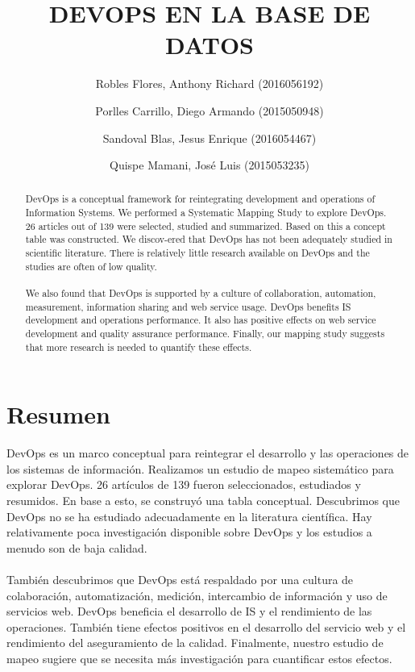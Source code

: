 \documentclass[preprint,12pt]{elsarticle}
\begin{document}
	
	\begin{frontmatter}

		\title{\huge  DEVOPS EN LA BASE DE DATOS}
		
		\author{Robles Flores, Anthony Richard	              (2016056192)}
		\author{Porlles Carrillo, Diego Armando              (2015050948)}
		\author{Sandoval Blas, Jesus Enrique           (2016054467)}
		\author{Quispe Mamani, José Luis              (2015053235)}
		
		\address{Tacna, Perú}
		
		\begin{abstract}
DevOps is a conceptual framework for reintegrating development and operations of Information Systems. We performed a Systematic Mapping Study to explore DevOps. 26 articles out of 139 were selected, studied and summarized. Based on this a concept table was constructed. We discov-ered that DevOps has not been adequately studied in scientific literature. There is relatively little research available on DevOps and the studies are often of low quality. 
\\
\\
We also found that DevOps is supported by a culture of collaboration, automation, measurement, information sharing and web service usage. DevOps benefits IS development and operations performance. It also has positive effects on web service development and quality assurance performance. Finally, our mapping study suggests that more research is needed to quantify these effects.
		\end{abstract}
\end{frontmatter}
	
	\section{Resumen}

DevOps es un marco conceptual para reintegrar el desarrollo y las operaciones de los sistemas de información. Realizamos un estudio de mapeo sistemático para explorar DevOps. 26 artículos de 139 fueron seleccionados, estudiados y resumidos. En base a esto, se construyó una tabla conceptual. Descubrimos que DevOps no se ha estudiado adecuadamente en la literatura científica. Hay relativamente poca investigación disponible sobre DevOps y los estudios a menudo son de baja calidad. 
\\
\\
También descubrimos que DevOps está respaldado por una cultura de colaboración, automatización, medición, intercambio de información y uso de servicios web. DevOps beneficia el desarrollo de IS y el rendimiento de las operaciones. También tiene efectos positivos en el desarrollo del servicio web y el rendimiento del aseguramiento de la calidad. Finalmente, nuestro estudio de mapeo sugiere que se necesita más investigación para cuantificar estos efectos.
\end{document}
